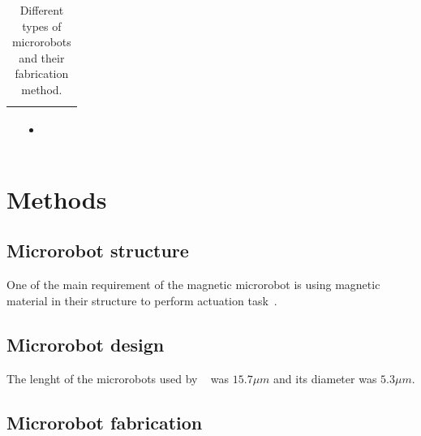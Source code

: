 \documentclass[12pt,a4paper,titlepage]{report}
\begin{document}
\begin{table}[h!]
\begin{tabular}{ c  m{3cm}  m{4.3cm} m{3cm} }
\begin{itemize}
      \end{itemize}
&
	   \begin{itemize}
        \item \citep{ko2012jellyfish}
   
      \end{itemize}
    \\ \hline



  \end{tabular}
  \caption{Different types of microrobots and their fabrication method.}\label{Micro}
\end{table}



\chapter{Methods}

\section{Microrobot structure}

One of the main requirement of the magnetic microrobot is using magnetic material in their structure 
to perform actuation task~\citep{qiu2014noncytotoxic}. 







\section{Microrobot design}

The lenght of the microrobots used by \citeauthor{qiu2014noncytotoxic}~\citep{qiu2014noncytotoxic} was
$15.7 \mu m$ and its diameter was $5.3 \mu m$. 






\section{Microrobot fabrication} \label{microFabric}
\subsection{}
\end{document}
